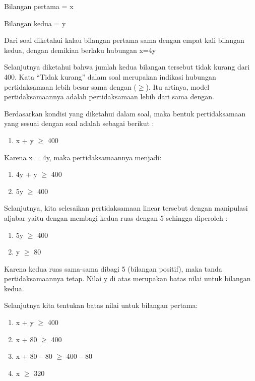 \documentclass[11pt,fleqn]{book} %
\begin{document}
\noindent Bilangan pertama = x

\noindent Bilangan kedua = y 

\noindent Dari soal diketahui kalau bilangan pertama sama dengan empat kali bilangan kedua, dengan demikian berlaku hubungan x=4y 

\noindent 

\noindent Selanjutnya diketahui bahwa jumlah kedua bilangan tersebut tidak kurang dari 400. Kata ``Tidak kurang'' dalam soal merupakan indikasi hubungan pertidaksamaan lebih besar sama dengan ($\mathrm{\ge}$). Itu artinya, model pertidaksamaannya adalah pertidaksamaan lebih dari sama dengan.

\noindent 

\noindent Berdasarkan kondisi yang diketahui dalam soal, maka bentuk pertidaksamaan yang sesuai dengan soal adalah sebagai berikut :

\begin{enumerate}
\item  x + y $\mathrm{\ge}$ 400
\end{enumerate}

\noindent Karena x = 4y, maka pertidaksamaannya menjadi:

\begin{enumerate}
\item  4y + y $\mathrm{\ge}$ 400

\item  5y $\mathrm{\ge}$ 400
\end{enumerate}

\noindent 

\noindent Selanjutnya, kita selesaikan pertidaksamaan linear tersebut dengan manipulasi aljabar yaitu dengan membagi kedua ruas dengan 5 sehingga diperoleh :

\begin{enumerate}
\item  5y $\mathrm{\ge}$ 400

\item  y $\mathrm{\ge}$ 80
\end{enumerate}

\noindent Karena kedua ruas sama-sama dibagi 5 (bilangan positif), maka tanda pertidaksamaannya tetap. Nilai y di atas merupakan batas nilai untuk bilangan kedua.

\noindent Selanjutnya kita tentukan batas nilai untuk bilangan pertama:

\begin{enumerate}
\item  x + y $\mathrm{\ge}$ 400

\item  x + 80 $\mathrm{\ge}$ 400

\item  x + 80 -- 80 $\mathrm{\ge}$ 400 -- 80 

\item  x $\mathrm{\ge}$ 320
\end{enumerate}
\end{document}
